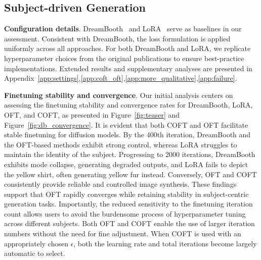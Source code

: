 {\subsection{Subject-driven Generation}

\textbf{Configuration details}. DreamBooth~\cite{ruiz2023dreambooth} and LoRA~\cite{hulora2022} serve as baselines in our assessment. Consistent with DreamBooth, the loss formulation is applied uniformly across all approaches. For both DreamBooth and LoRA, we replicate hyperparameter choices from the original publications to ensure best-practice implementations. Extended results and supplementary analyses are presented in Appendix~\ref{app:settings},\ref{app:coft_oft},\ref{app:more_qualitative},\ref{app:failure}.

\textbf{Finetuning stability and convergence}. Our initial analysis centers on assessing the finetuning stability and convergence rates for DreamBooth, LoRA, OFT, and COFT, as presented in Figure~\ref{fig:teaser} and Figure~\ref{fig:db_convergence}. It is evident that both COFT and OFT facilitate stable finetuning for diffusion models. By the 400th iteration, DreamBooth and the OFT-based methods exhibit strong control, whereas LoRA struggles to maintain the identity of the subject. Progressing to 2000 iterations, DreamBooth exhibits mode collapse, generating degraded outputs, and LoRA fails to depict the yellow shirt, often generating yellow fur instead. Conversely, OFT and COFT consistently provide reliable and controlled image synthesis. These findings support that OFT rapidly converges while retaining stability in subject-centric generation tasks. Importantly, the reduced sensitivity to the finetuning iteration count allows users to avoid the burdensome process of hyperparameter tuning across different subjects. Both OFT and COFT enable the use of larger iteration numbers without the need for fine adjustment. When COFT is used with an appropriately chosen $\epsilon$, both the learning rate and total iterations become largely automatic to select.

}
